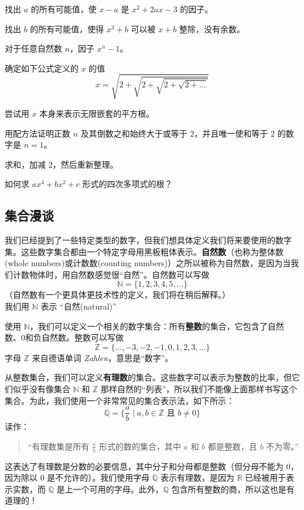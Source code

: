 \begin{problem}
    找出 $a$ 的所有可能值，使 $x-a$ 是 $x^2+2ax-3$ 的因子。
\end{problem}
\begin{problem}
    找出 $b$ 的所有可能值，使得 $x^3 + b$ 可以被 $x + b$ 整除，没有余数。
\end{problem}
\begin{problem}
    对于任意自然数 $n$，因子 $x^n - 1$。
\end{problem}
\begin{problem}
    确定如下公式定义的 $x$ 的值
    \[x = \sqrt{2+\sqrt{2+\sqrt{2+\sqrt{2+\dots}}}}\]
    \begin{hint}
        尝试用 $x$ 本身来表示无限嵌套的平方根。
    \end{hint}
\end{problem}
\begin{problem}
    用配方法证明正数 $n$ 及其倒数之和始终大于或等于 $2$，并且唯一使和等于 $2$ 的数字是 $n = 1$。
    \begin{hint}
        求和，加减 $2$，然后重新整理。
    \end{hint}
\end{problem}
\begin{problem}
    如何求 $ax^4 + bx^2 + c$ 形式的四次多项式的根？
\end{problem}

\subsection{集合漫谈}

我们已经提到了一些特定类型的数字，但我们想具体定义我们将来要使用的数字集。这些数字集合都由一个特定字母用黑板粗体表示。\textbf{自然数}（也称为整体数(whole numbers)或计数数(counting numbers)）之所以被称为自然数，是因为当我们计数物体时，用自然数感觉很“自然”。自然数可以写做
\[\mathbb{N} = \{1, 2, 3, 4, 5, \dots\}\]
（自然数有一个更具体更技术性的定义，我们将在稍后解释。）\\
我们用 $\mathbb{N}$ 表示 “自然(natural)”

使用 $\mathbb{N}$，我们可以定义一个相关的数字集合：所有\textbf{整数}的集合，它包含了自然数、0和负自然数。整数可以写做
\[\mathbb{Z} = \{\dots, -3, -2, -1, 0, 1, 2, 3, \dots\}\]
字母 $\mathbb{Z}$ 来自德语单词 \textit{Zahlen}，意思是“数字”。

从整数集合，我们可以定义\textbf{有理数}的集合。这些数字可以表示为整数的比率，但它们似乎没有像集合 $\mathbb{N}$ 和 $\mathbb{Z}$ 那样自然的“列表”，所以我们不能像上面那样书写这个集合。为此，我们使用一个非常常见的集合表示法，如下所示：
\[\mathbb{Q} = \Big\{\frac{a}{b} \mid a,b \in \mathbb{Z} \text{ 且 } b \ne 0\Big\}\]
读作：
\begin{quote}
    “有理数集是所有 $\frac{a}{b}$ 形式的数的集合，其中 $a$ 和 $b$ 都是整数，且 $b$ 不为零。”
\end{quote}
这表达了有理数是分数的必要信息，其中分子和分母都是整数（但分母不能为 $0$，因为除以 $0$ 是不允许的）。我们使用字母 $\mathbb{Q}$ 表示有理数，是因为 $\mathbb{R}$ 已经被用于表示实数，而 $\mathbb{Q}$ 是上一个可用的字母。此外，$\mathbb{Q}$ 包含所有整数的商，所以这也是有道理的！

